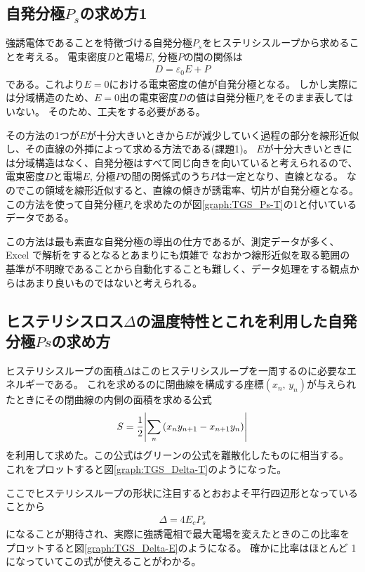 \documentclass[9pt,dvipdfmx,a4paper]{jsarticle}
\begin{document}
\subsection{自発分極\(P_s\)の求め方1}
強誘電体であることを特徴づける自発分極\(P_s\)をヒステリシスループから求めることを考える。
電束密度\(D\)と電場\(E\), 分極\(P\)の間の関係は
\begin{align}
    D = \varepsilon_0 E + P
\end{align}
である。これより\(E=0\)における電束密度の値が自発分極となる。
しかし実際には分域構造のため、\(E=0\)出の電束密度\(D\)の値は自発分極\(P_s\)をそのまま表してはいない。
そのため、工夫をする必要がある。

その方法の1つが\(E\)が十分大きいときから\(E\)が減少していく過程の部分を線形近似し、その直線の外挿によって求める方法である(課題1)。
\(E\)が十分大きいときには分域構造はなく、自発分極はすべて同じ向きを向いていると考えられるので、
電束密度\(D\)と電場\(E\), 分極\(P\)の間の関係式のうち\(P\)は一定となり、直線となる。
なのでこの領域を線形近似すると、直線の傾きが誘電率、切片が自発分極となる。
この方法を使って自発分極\(P_s\)を求めたのが図\ref{graph:TGS_Ps-T}の1と付いているデータである。

この方法は最も素直な自発分極の導出の仕方であるが、測定データが多く、Excel で解析をするとなるとあまりにも煩雑で
なおかつ線形近似を取る範囲の基準が不明瞭であることから自動化することも難しく、データ処理をする観点からはあまり良いものではないと考えられる。

\subsection{ヒステリシスロス\(\Delta\)の温度特性とこれを利用した自発分極\(Ps\)の求め方}
ヒステリシスループの面積\(\Delta\)はこのヒステリシスループを一周するのに必要なエネルギーである。
これを求めるのに閉曲線を構成する座標\((x_n,\,y_n)\)が与えられたときにその閉曲線の内側の面積を求める公式
\begin{align}
    S = \frac{1}{2}\abs{\sum_n \qty(x_n y_{n+1} - x_{n+1}y_n)}
\end{align}
を利用して求めた。この公式はグリーンの公式を離散化したものに相当する。
これをプロットすると図\ref{graph:TGS_Delta-T}のようになった。

ここでヒステリシスループの形状に注目するとおおよそ平行四辺形となっていることから
\begin{align}
    \Delta = 4 E_c P_s
\end{align}
になることが期待され、実際に強誘電相で最大電場を変えたときのこの比率をプロットすると図\ref{graph:TGS_Delta-E}のようになる。
確かに比率はほとんど 1 になっていてこの式が使えることがわかる。
\end{document}
